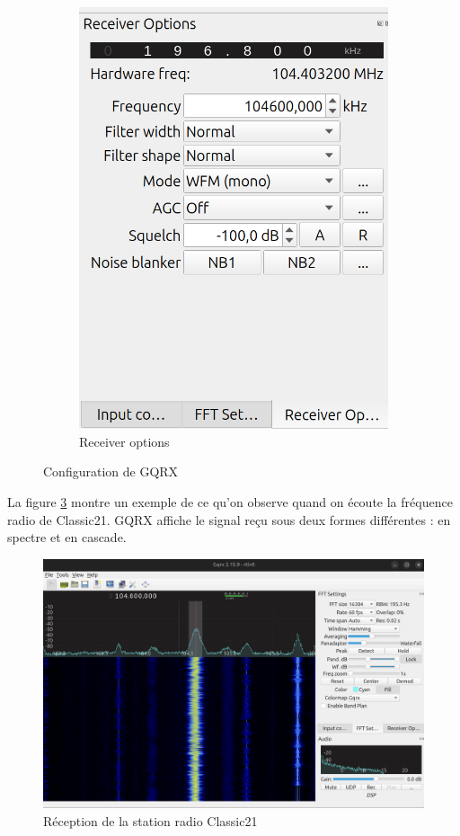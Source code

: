 \begin{figure}[h]
\begin{subfigure}{0.4\textwidth}
  \includegraphics[width=\textwidth]{images/gqrx3.png}
  \caption{Receiver options}
  \label{term341}
\end{subfigure}
\caption{Configuration de GQRX}
\label{term37}
\end{figure}

La figure \ref{term38} montre un exemple de ce qu'on observe quand on écoute la fréquence radio de Classic21. GQRX affiche le signal reçu sous deux formes différentes : en spectre et en cascade.

\begin{figure}[h]
\centering

\includegraphics[scale=0.18]{images/gqrx1.png}
\caption{Réception de la station radio Classic21}\label{term38}
\end{figure}


